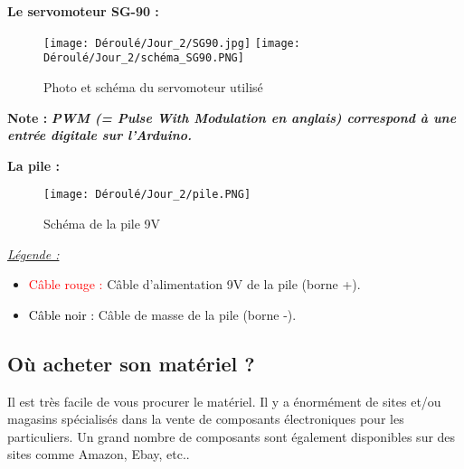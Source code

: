     \begin{flushleft}
    \textbf{Le servomoteur SG-90 :}\vspace{0.4cm}
    \end{flushleft}
    \begin{figure}[!h]
        \centering
        \texttt{[image: Déroulé/Jour\_2/SG90.jpg]}
        \texttt{[image: Déroulé/Jour\_2/schéma\_SG90.PNG]}
        \caption[Servomoteur SG-90]{Photo et schéma du servomoteur utilisé}
        \label{2.5}
    \end{figure}
    
    \begin{flushleft}
    \textbf{\large Note : }\textbf{\textit{ PWM (= Pulse With Modulation en anglais) correspond à une entrée digitale sur l'Arduino.}}\\\vspace{0.2cm}
    \end{flushleft}
    
    \newpage
    
    \begin{flushleft}
    \textbf{La pile :}\vspace{0.4cm}
    \end{flushleft}
    \begin{figure}[!h]
        \centering
        \texttt{[image: Déroulé/Jour\_2/pile.PNG]}
        \caption[Pile]{Schéma de la pile 9V}
        \label{fig:my_label}
    \end{figure}
    \begin{flushleft}
    \underline{\textit{\large Légende :}}\vspace{0.4cm}
    
    \begin{itemize}
    \item \textcolor{red}{Câble rouge :} Câble d'alimentation 9V de la pile (borne +).\vspace{0.2cm}
    \item \textcolor{black}{Câble noir :} Câble de masse de la pile (borne -).
    \end{itemize}
    \end{flushleft}
    
\subsection{Où acheter son matériel ?}

\begin{flushleft}
     Il est très facile de vous procurer le matériel. Il y a énormément de sites et/ou magasins spécialisés dans la vente de composants électroniques pour les particuliers. Un grand nombre de composants sont également disponibles sur des sites comme Amazon, Ebay, etc..
\end{flushleft}
